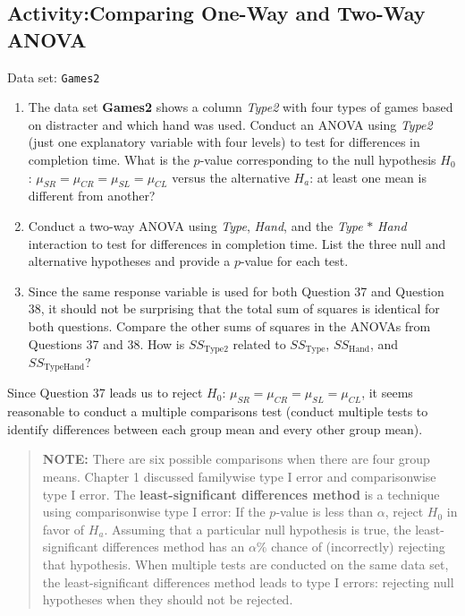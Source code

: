 \documentclass[
]{book}
\providecommand{\tightlist}{%
  \setlength{\itemsep}{0pt}\setlength{\parskip}{0pt}}
\begin{document}
\hypertarget{activitycomparing-one-way-and-two-way-anova}{%
\subsection*{Activity:Comparing One-Way and Two-Way ANOVA}\label{activitycomparing-one-way-and-two-way-anova}}

Data set: \texttt{Games2}

\begin{enumerate}
\def\labelenumi{\arabic{enumi}.}
\setcounter{enumi}{36}
\tightlist
\item
  The data set \textbf{Games2} shows a column \emph{Type2} with four types of games based on distracter and which hand was used. Conduct an ANOVA using \emph{Type2} (just one explanatory variable with four levels) to test for differences in completion time. What is the \(p\)-value corresponding to the null hypothesis \(H_0\): \(\mu_{SR} = \mu_{CR} = \mu_{SL} = \mu_{CL}\) versus the alternative \(H_a\): at least one mean is different from another?
\item
  Conduct a two-way ANOVA using \emph{Type}, \emph{Hand}, and the \emph{Type} \(\ast\) \emph{Hand} interaction to test for differences in completion time. List the three null and alternative hypotheses and provide a \(p\)-value for each test.
\item
  Since the same response variable is used for both Question 37 and Question 38, it should not be surprising that the total sum of squares is identical for both questions. Compare the other sums of squares in the ANOVAs from Questions 37 and 38. How is \(SS_{\text{Type2}}\) related to \(SS_{\text{Type}}\), \(SS_{\text{Hand}}\), and \(SS_{\text{TypeHand}}\)?
\end{enumerate}

Since Question 37 leads us to reject \(H_0\): \(\mu_{SR} = \mu_{CR} = \mu_{SL} = \mu_{CL}\), it seems reasonable to conduct a multiple comparisons test (conduct multiple tests to identify differences between each group mean and every other group mean).

\begin{quote}
\textbf{NOTE:} There are six possible comparisons when there are four group means. Chapter 1 discussed familywise type I error and comparisonwise type I error. The \textbf{least-significant differences method} is a technique using comparisonwise type I error: If the \(p\)-value is less than \(\alpha\), reject \(H_0\) in favor of \(H_a\). Assuming that a particular null hypothesis is true, the least-significant differences method has an \(\alpha\%\) chance of (incorrectly) rejecting that hypothesis. When multiple tests are conducted on the same data set, the least-significant differences method leads to type I errors: rejecting null hypotheses when they should not be rejected.
\end{quote}
\end{document}
